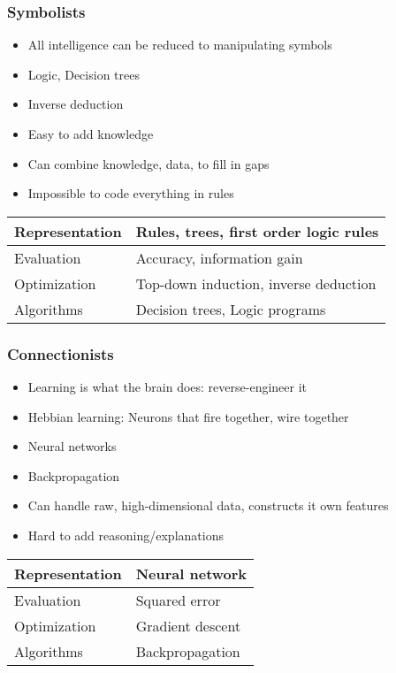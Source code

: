 \documentclass[UTF8,11pt,colorlinks,compress,openany]{beamer}%
\begin{document}
\begin{frame}\frametitle{Symbolists}
\begin{itemize}
	\item All intelligence can be reduced to manipulating symbols
	\item Logic, Decision trees
	\item Inverse deduction
	\item Easy to add knowledge
	\item Can combine knowledge, data, to fill in gaps
	\item Impossible to code everything in rules
\end{itemize}
\begin{table}
\begin{tabu}{l|l}
\hline
Representation &Rules, trees, first order logic rules\\
\hline
Evaluation &Accuracy, information gain\\
\hline
Optimization &Top-down induction, inverse deduction\\
\hline
Algorithms &Decision trees, Logic programs\\
\hline
\end{tabu}
\end{table}
\end{frame}

\begin{frame}\frametitle{Connectionists}
\begin{itemize}
	\item Learning is what the brain does: reverse-engineer it
	\item Hebbian learning: Neurons that fire together, wire together
	\item Neural networks
	\item Backpropagation
	\item Can handle raw, high-dimensional data, constructs it own features
	\item Hard to add reasoning/explanations
\end{itemize}
\begin{table}
\begin{tabu}{l|l}
\hline
Representation &Neural network\\
\hline
Evaluation &Squared error\\
\hline
Optimization &Gradient descent\\
\hline
Algorithms &Backpropagation\\
\hline
\end{tabu}
\end{table}
\end{frame}
\end{document}
